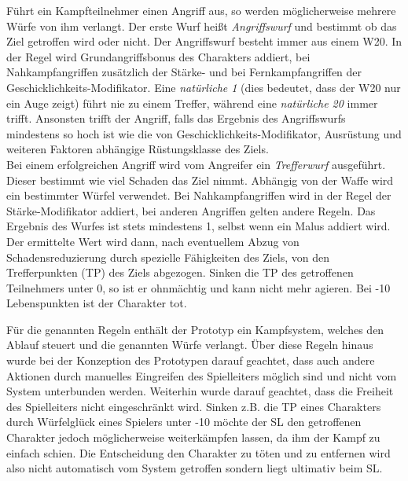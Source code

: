 Führt ein Kampfteilnehmer einen Angriff aus, so werden möglicherweise mehrere Würfe von ihm verlangt. Der erste Wurf heißt \emph{Angriffswurf} und bestimmt ob das Ziel getroffen wird oder nicht. Der Angriffswurf besteht immer aus einem W20. In der Regel wird Grundangriffsbonus des Charakters addiert, bei Nahkampfangriffen zusätzlich der Stärke- und bei Fernkampfangriffen der Geschicklichkeits-Modifikator. Eine \emph{natürliche 1} (dies bedeutet, dass der W20 nur ein Auge zeigt) führt nie zu einem Treffer, während eine \emph{natürliche 20} immer trifft. Ansonsten trifft der Angriff, falls das Ergebnis des Angriffswurfs mindestens so hoch ist wie die von Geschicklichkeits-Modifikator, Ausrüstung und weiteren Faktoren abhängige Rüstungsklasse des Ziels.\\
Bei einem erfolgreichen Angriff wird vom Angreifer ein \emph{Trefferwurf} ausgeführt. Dieser bestimmt wie viel Schaden das Ziel nimmt. Abhängig von der Waffe wird ein bestimmter Würfel verwendet. Bei Nahkampfangriffen wird in der Regel der Stärke-Modifikator addiert, bei anderen Angriffen gelten andere Regeln. Das Ergebnis des Wurfes ist stets mindestens 1, selbst wenn ein Malus addiert wird. Der ermittelte Wert wird dann, nach eventuellem Abzug von Schadensreduzierung durch spezielle Fähigkeiten des Ziels, von den Trefferpunkten (TP) des Ziels abgezogen. Sinken die TP des getroffenen Teilnehmers unter 0, so ist er ohnmächtig und kann nicht mehr agieren. Bei -10 Lebenspunkten ist der Charakter tot.

Für die genannten Regeln enthält der Prototyp ein Kampfsystem, welches den Ablauf steuert und die genannten Würfe verlangt. Über diese Regeln hinaus wurde bei der Konzeption des Prototypen darauf geachtet, dass auch andere Aktionen durch manuelles Eingreifen des Spielleiters möglich sind und nicht vom System unterbunden werden. Weiterhin wurde darauf geachtet, dass die Freiheit des Spielleiters nicht eingeschränkt wird. Sinken z.B. die TP eines Charakters durch Würfelglück eines Spielers unter -10 möchte der SL den getroffenen Charakter jedoch möglicherweise weiterkämpfen lassen, da ihm der Kampf zu einfach schien. Die Entscheidung den Charakter zu töten und zu entfernen wird also nicht automatisch vom System getroffen sondern liegt ultimativ beim SL.




